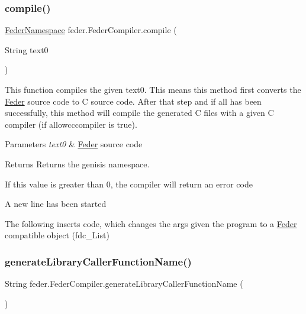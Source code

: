 \subsubsection{\texorpdfstring{compile()}{compile()}}
{\footnotesize\ttfamily \hyperlink{classfeder_1_1types_1_1FederNamespace}{Feder\+Namespace} feder.\+Feder\+Compiler.\+compile (\begin{DoxyParamCaption}\item[{String}]{text0 }\end{DoxyParamCaption})}

This function compiles the given \textquotesingle{}text0\textquotesingle{}. This means this method first converts the \hyperlink{classfeder_1_1Feder}{Feder} source code to C source code. After that step and if all has been successfully, this method will compile the generated C files with a given C compiler (if allowcccompiler is true). 
\begin{DoxyParams}{Parameters}
{\em text0} & \hyperlink{classfeder_1_1Feder}{Feder} source code \\
\hline
\end{DoxyParams}
\begin{DoxyReturn}{Returns}
Returns the \textquotesingle{}genisis\textquotesingle{} namespace. 
\end{DoxyReturn}
If this value is greater than 0, the compiler will return an error code

A new line has been started

The following inserts code, which changes the args given the program to a \hyperlink{classfeder_1_1Feder}{Feder} compatible object (fdc\+\_\+\+List)\mbox{\label{classfeder_1_1FederCompiler_ab3314b260330e1ce37132849bcb50b75}} 
\subsubsection{\texorpdfstring{generate\+Library\+Caller\+Function\+Name()}{generateLibraryCallerFunctionName()}}
{\footnotesize\ttfamily String feder.\+Feder\+Compiler.\+generate\+Library\+Caller\+Function\+Name (\begin{DoxyParamCaption}{ }\end{DoxyParamCaption})}

